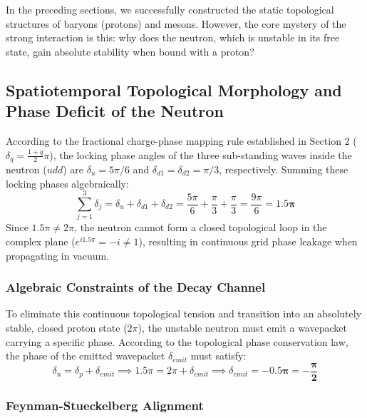 \documentclass[12pt, a4paper]{article}
\begin{document}
In the preceding sections, we successfully constructed the static topological structures of baryons (protons) and mesons. However, the core mystery of the strong interaction is this: why does the neutron, which is unstable in its free state, gain absolute stability when bound with a proton?

\subsection{Spatiotemporal Topological Morphology and Phase Deficit of the Neutron}

According to the fractional charge-phase mapping rule established in Section 2 ($\delta_q = \frac{1+q}{2}\pi$), the locking phase angles of the three sub-standing waves inside the neutron ($udd$) are $\delta_{u} = 5\pi/6$ and $\delta_{d1} = \delta_{d2} = \pi/3$, respectively. Summing these locking phases algebraically:
\begin{equation}
\sum_{j=1}^3 \delta_j = \delta_u + \delta_{d1} + \delta_{d2} = \frac{5\pi}{6} + \frac{\pi}{3} + \frac{\pi}{3} = \frac{9\pi}{6} = \mathbf{1.5\pi} \label{eq:neutron_phase_sum}
\end{equation}
Since $1.5\pi \neq 2\pi$, the neutron cannot form a closed topological loop in the complex plane ($e^{i1.5\pi} = -i \neq 1$), resulting in continuous grid phase leakage when propagating in vacuum.

\subsubsection{Algebraic Constraints of the Decay Channel}

To eliminate this continuous topological tension and transition into an absolutely stable, closed proton state ($2\pi$), the unstable neutron must emit a wavepacket carrying a specific phase. According to the topological phase conservation law, the phase of the emitted wavepacket $\delta_{emit}$ must satisfy:
\begin{equation}
\delta_n = \delta_p + \delta_{emit} \implies 1.5\pi = 2\pi + \delta_{emit} \implies \delta_{emit} = \mathbf{-0.5\pi = -\frac{\pi}{2}} \label{eq:phase_emit}
\end{equation}

\subsubsection{Feynman-Stueckelberg Alignment}
\end{document}

